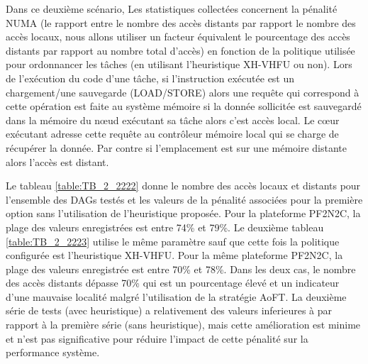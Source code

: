 Dans ce deuxième scénario, Les statistiques collectées concernent la pénalité NUMA (le rapport entre le nombre des accès distants par rapport  le nombre des accès locaux, nous allons utiliser un facteur équivalent le pourcentage des accès distants par rapport au nombre total d'accès) en fonction de la politique utilisée pour ordonnancer les tâches (en utilisant l'heuristique XH-VHFU ou non). Lors de l'exécution du code d'une tâche, si l'instruction exécutée est un chargement/une sauvegarde (LOAD/STORE) alors une requête qui correspond à cette opération est faite au système mémoire si la donnée sollicitée est sauvegardé dans la mémoire du nœud exécutant sa tâche alors c'est accès local. Le cœur exécutant adresse cette requête au contrôleur mémoire local qui se charge de récupérer la donnée. Par contre si l'emplacement est sur une mémoire distante alors l'accès est distant. 

Le tableau \ref{table:TB_2_2222} donne le nombre des accès locaux et distants pour l'ensemble des DAGs testés et les valeurs de la pénalité associées pour la première option sans l'utilisation de l'heuristique proposée. Pour la plateforme PF2N2C, la plage des valeurs enregistrées est entre 74\% et 79\%.  Le deuxième tableau \ref{table:TB_2_2223} utilise le même paramètre sauf que cette fois la politique configurée est l'heuristique XH-VHFU. Pour la même plateforme PF2N2C, la plage des valeurs enregistrée est entre 70\% et 78\%. 
Dans les deux cas, le nombre des accès distants dépasse 70\% qui est un pourcentage élevé et un indicateur d'une mauvaise localité malgré l'utilisation de la stratégie AoFT. La deuxième série de tests (avec heuristique) a relativement des valeurs inferieures à par rapport à la première série (sans heuristique), mais cette amélioration est minime et n'est pas significative pour réduire l'impact de cette pénalité sur la performance système.

